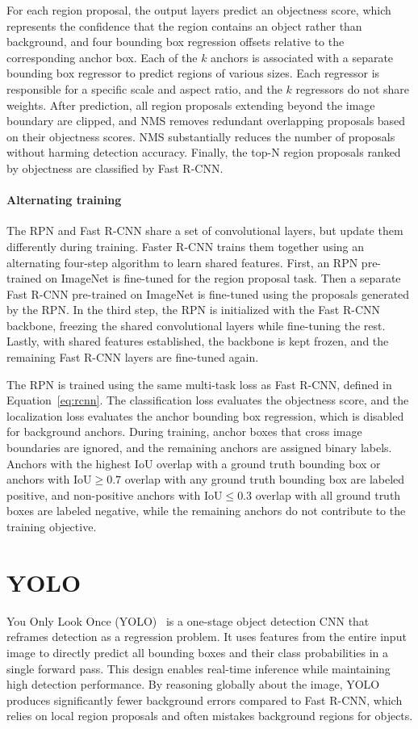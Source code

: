 For each region proposal, the output layers predict an objectness score, which represents the confidence that the region contains an object rather than background, and four bounding box regression offsets relative to the corresponding anchor box. Each of the $k$ anchors is associated with a separate bounding box regressor to predict regions of various sizes. Each regressor is responsible for a specific scale and aspect ratio, and the $k$ regressors do not share weights. After prediction, all region proposals extending beyond the image boundary are clipped, and NMS removes redundant overlapping proposals based on their objectness scores. NMS substantially reduces the number of proposals without harming detection accuracy. Finally, the top-N region proposals ranked by objectness are classified by Fast R-CNN.~\cite{Ren2015}

\paragraph{Alternating training} The RPN and Fast R-CNN share a set of convolutional layers, but update them differently during training. Faster R-CNN trains them together using an alternating four-step algorithm to learn shared features. First, an RPN pre-trained on ImageNet is fine-tuned for the region proposal task. Then a separate Fast R-CNN pre-trained on ImageNet is fine-tuned using the proposals generated by the RPN. In the third step, the RPN is initialized with the Fast R-CNN backbone, freezing the shared convolutional layers while fine-tuning the rest. Lastly, with shared features established, the backbone is kept frozen, and the remaining Fast R-CNN layers are fine-tuned again.

The RPN is trained using the same multi-task loss as Fast R-CNN, defined in Equation~\ref{eq:rcnn}. The classification loss evaluates the objectness score, and the localization loss evaluates the anchor bounding box regression, which is disabled for background anchors. During training, anchor boxes that cross image boundaries are ignored, and the remaining anchors are assigned binary labels. Anchors with the highest IoU overlap with a ground truth bounding box or anchors with $\text{IoU} \ge 0.7$ overlap with any ground truth bounding box are labeled positive, and non-positive anchors with $\text{IoU} \le 0.3$ overlap with all ground truth boxes are labeled negative, while the remaining anchors do not contribute to the training objective.~\cite{Ren2015}


\section{YOLO}
You Only Look Once (YOLO)~\cite{Redmon2016} is a one-stage object detection CNN that reframes detection as a regression problem. It uses features from the entire input image to directly predict all bounding boxes and their class probabilities in a single forward pass. This design enables real-time inference while maintaining high detection performance. By reasoning globally about the image, YOLO produces significantly fewer background errors compared to Fast R-CNN, which relies on local region proposals and often mistakes background regions for objects.

